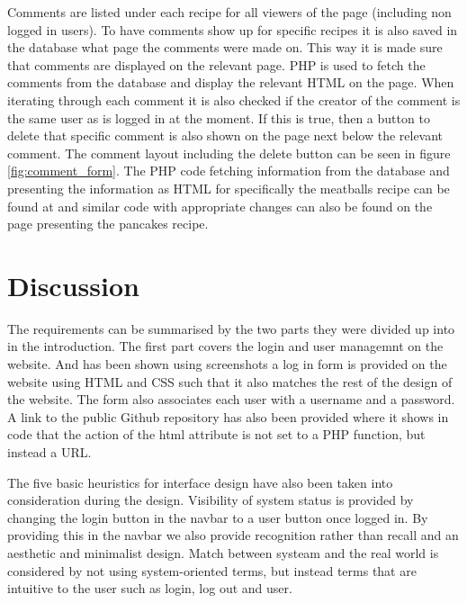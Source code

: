 \documentclass[a4paper]{scrartcl}
\begin{document}
Comments are listed under each recipe for all viewers of the page (including non logged in users). To have comments show up for specific recipes it is also saved in the database what page the comments were made on. This way it is made sure that comments are displayed on the relevant page. PHP is used to fetch the comments from the database and display the relevant HTML on the page. When iterating through each comment it is also checked if the creator of the comment is the same user as is logged in at the moment. If this is true, then a button to delete that specific comment is also shown on the page next below the relevant comment. The comment layout including the delete button can be seen in figure \ref{fig:comment_form}.
The PHP code fetching information from the database and presenting the information as HTML for specifically the meatballs recipe can be found at \citet{kimblad_git_2019-comments} and similar code with appropriate changes can also be found on the page presenting the pancakes recipe.

\section{Discussion}

The requirements can be summarised by the two parts they were divided up into in the introduction. The first part covers the login and user managemnt on the website. And has been shown using screenshots a log in form is provided on the website using HTML and CSS such that it also matches the rest of the design of the website. The form also associates each user with a username and a password. A link to the public Github repository has also been provided where it shows in code that the action of the html attribute is not set to a PHP function, but instead a URL. 

The five basic heuristics for interface design have also been taken into consideration during the design. Visibility of system status is provided by changing the login button in the navbar to a user button once logged in. By providing this in the navbar we also provide recognition rather than recall and an aesthetic and minimalist design. Match between systeam and the real world is considered by not using system-oriented terms, but instead terms that are intuitive to the user such as login, log out and user. 
\end{document}
